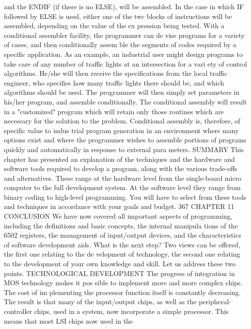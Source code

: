 \documentclass{book}
\begin{document}
{{{{{{{{{{{{{{{{{{{{{{{{{{{{{{{{{{{{{{{{{{{{{{{{{{{{{{{{{{{{{{{{{{{{{{{{{{{{{{{{{{{{{{{{{{{{{{{{{{{{{{{{{{{{{{{{{{{{{{{{{{{{{{{{{{{{{{{{{{{{and the ENDIF (if there is no ELSE), will be assembled. In the case
in which IF followed by ELSE is used, either one of the twc blocks of
instructions will be assembled, depending on the value of the ex
pression being tested.
With a conditional assembler facility, the programmer can de
vise programs for a variety of cases, and then conditionally assem
ble the segments of codes required by a specific application. As
an example, an industrial user might design programs to take
care of any number of traffic lights at an intersection for a vari
ety of control algorithms. He/she will then receive the specifications
from the local traffic engineer, who specifies how many traffic
lights there should be, and which algorithms should be used. The
programmer will then simply set parameters in his/her program, and
assemble conditionally. The conditional assembly will result in a
"customized" program which will retain only those routines
which are necessary for the solution to the problem.
Conditional assembly is, therefore, of specific value to indus
trial program generation in an environment where many options
exist and where the programmer wishes to assemble portions of
programs quickly and automatically in response to external para
meters.
SUMMARY
This chapter has presented an explanation of the techniques and the
hardware and software tools required to develop a program, along with
the various trade-offs and alternatives.
These range at the hardware level from the single-board micro
computer to the full development system. At the software level
they range from binary coding to high-level programming. You
will have to select from these tools and techniques in accordance
with your goals and budget.
367
CHAPTER 11
CONCLUSION
We have now covered all important aspects of programming,
including the definitions and basic concepts, the internal manipula
tions of the 6502 registers, the management of input/output devices,
and the characteristics of software development aids. What is the
next step? Two views can be offered, the first one relating to the de
velopment of technology, the second one relating to the development
of your own knowledge and skill. Let us address these two points.
TECHNOLOGICAL DEVELOPMENT
The progress of integration in MOS technology makes it pos
sible to implement more and more complex chips. The cost of im
plementing the processor function itself is constantly decreasing.
The result is that many of the input/output chips, as well as the
peripheral-controller chips, used in a system, now incorporate a
simple processor. This means that most LSI chips now used in the
}}}}}}}}}}}}}}}}}}}}}}}}}}}}}}}}}}}}}}}}}}}}}}}}}}}}}}}}}}}}}}}}}}}}}}}}}}}}}}}}}}}}}}}}}}}}}}}}}}}}}}}}}}}}}}}}}}}}}}}}}}}}}}}}}}}}}}}}}}}}
\end{document}
